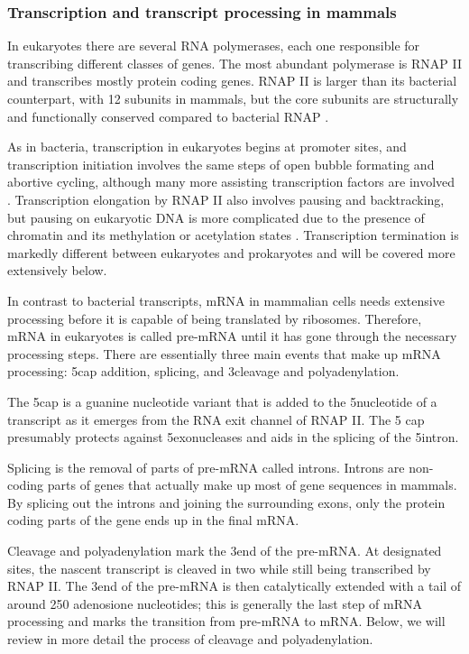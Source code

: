 %
\subsubsection{Transcription and transcript processing in mammals}
In eukaryotes there are several RNA polymerases, each one responsible for
transcribing different classes of genes. The most abundant polymerase is 
RNAP II and transcribes mostly protein coding genes. RNAP II is larger than its
bacterial counterpart, with 12 subunits in mammals, but the core subunits are
structurally and functionally conserved compared to bacterial RNAP
\cite{ebright_rna_2000}.

As in bacteria, transcription in eukaryotes begins at promoter sites, and
transcription initiation involves the same steps of open bubble formating and
abortive cycling, although many more assisting transcription factors are
involved \cite{wade_transition_2008}. Transcription elongation by RNAP II also
involves pausing and backtracking, but pausing on eukaryotic DNA is more
complicated due to the presence of chromatin and its methylation or acetylation
states \cite{sims_elongation_2004}. Transcription termination is markedly
different between eukaryotes and prokaryotes and will be covered more
extensively below.

In contrast to bacterial transcripts, mRNA in mammalian cells needs
extensive processing before it is capable of being translated by ribosomes.
Therefore, mRNA in eukaryotes is called pre-mRNA until it has gone through the
necessary processing steps. There are essentially three main events that make
up mRNA processing: 5\p cap addition, splicing, and 3\p cleavage and
polyadenylation.

The 5\p cap is a guanine nucleotide variant that is added to the 5\p nucleotide
of a transcript as it emerges from the RNA exit channel of RNAP II. The 5\p
cap presumably protects against 5\p exonucleases and aids in the splicing of
the 5\p intron.

Splicing is the removal of parts of pre-mRNA called introns. Introns are
non-coding parts of genes that actually make up most of gene sequences in
mammals. By splicing out the introns and joining the surrounding exons, only
the protein coding parts of the gene ends up in the final mRNA.

Cleavage and polyadenylation mark the 3\p end of the pre-mRNA. At designated
sites, the nascent transcript is cleaved in two while still being transcribed
by RNAP II. The 3\p end of the pre-mRNA is then catalytically extended with a
tail of around 250 adenosione nucleotides; this is generally the last step of
mRNA processing and marks the transition from pre-mRNA to mRNA. Below, we will
review in more detail the process of cleavage and polyadenylation.

